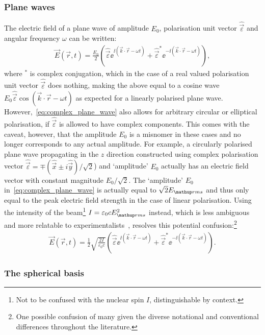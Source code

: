 \subsubsection{Plane waves}

The electric field of a plane wave of amplitude $E_0$, polarisation unit vector $\hat{\vec\varepsilon}$ and angular frequency $\omega$ can be written:
\begin{align}\label{eq:complex_plane_wave}
\vec E(\vec r, t) = \frac{E_0}2
\left(\hat{\vec\varepsilon} \ee^{\ii(\vec k \cdot \vec r - \omega t)}
+ \hat{\vec\varepsilon}^* \ee^{-\ii(\vec k \cdot \vec r - \omega t)} \right),
\end{align}
where $^*$ is complex conjugation, which in the case of a real valued polarisation unit vector $\hat{\vec\varepsilon}$ does nothing, making the above equal to a cosine wave $E_0\hat{\vec\varepsilon}\cos(\vec k \cdot \vec r - \omega t)$ as expected for a linearly polarised plane wave. However,~\eqref{eq:complex_plane_wave} also allows for arbitrary circular or elliptical polarisation, if $\hat{\vec\varepsilon}$ is allowed to have complex components. This comes with the caveat, however, that the amplitude $E_0$ is a misnomer in these cases and no longer corresponds to any actual amplitude. For example, a circularly polarised plane wave propagating in the $z$ direction constructed using complex polarisation vector $\hat{\vec\varepsilon}=\mp(\hat{\vec{x}} \pm i \hat{\vec y})/\sqrt{2}$) and `amplitude' $E_0$ actually has an electric field vector with constant magnitude $E_0/\sqrt{2}$. The `amplitude' $E_0$ in~\eqref{eq:complex_plane_wave} is actually equal to $\sqrt{2}E_\up{rms}$ and thus only equal to the peak electric field strength in the case of linear polarisation. Using the intensity of the beam\footnote{Not to be confused with the nuclear spin $I$, distinguishable by context.} $I=\varepsilon_0 c E_\up{rms}^2$ instead, which is less ambiguous and more relatable to experimentalists~\cite{king_angular_2008}, resolves this potential confusion:\footnote{One possible confusion of many given the diverse notational and conventional differences throughout the literature.}
\begin{align}\label{eq:complex_plane_wave_intensity}
\vec E(\vec r, t) = \frac12\sqrt{\frac{2I}{\varepsilon_0 c}}
\left(\hat{\vec\varepsilon} \ee^{\ii(\vec k \cdot \vec r - \omega t)}
+ \hat{\vec\varepsilon}^* \ee^{-\ii(\vec k \cdot \vec r - \omega t)} \right).
\end{align}

\subsubsection{The spherical basis}

